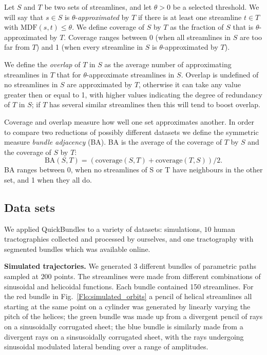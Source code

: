 \documentclass{bioinfo}
\begin{document}
\begin{methods}
Let $S$ and $T$ be two sets of streamlines, and let $\theta>0$ be a
selected threshold. We will say that $s \in S$ is
$\theta$-\emph{approximated} by $T$ if there is at least one streamline
$t \in T$ with $\mathrm{MDF}(s,t)\le \theta$. We define coverage of $S$
by $T$ as the fraction of $S$ that is $\theta$-approximated by $T$. Coverage
ranges between 0 (when all streamlines in $S$ are too far from $T$) and
1 (when every streamline in $S$ is $\theta$-approximated by $T$).

We define the \emph{overlap} of $T$ in $S$ as the average number of
approximating streamlines in $T$ that for $\theta$-approximate
streamlines in $S$.  Overlap is undefined of no streamlines in $S$ are
approximated by $T$, otherwise it can take any value greater then or
equal to 1, with higher values indicating the degree of redundancy of
$T$ in $S$; if $T$ has several similar streamlines then this will tend
to boost overlap.

Coverage and overlap measure how well one set approximates another. In
order to compare two reductions of possibly different datasets we
define the symmetric measure \emph{bundle adjacency} (BA).  BA is the
average of the coverage of $T$ by $S$ and the coverage of $S$ by
$T$: $$\mathrm{BA}(S,T) = (\mathrm{coverage}(S,T) +
\mathrm{coverage}(T,S))/2.$$ BA ranges between 0, when no streamlines of
S or T have neighbours in the other set, and 1 when they all do.

\subsection{\label{sub:QB-Data-sets}Data sets}

We applied QuickBundles to a variety of datasets: simulations, $10$
human tractographies collected and processed by ourselves, and one
tractography with segmented bundles which was available online.

\textbf{Simulated trajectories.} We generated $3$ different bundles of
parametric paths sampled at $200$ points. The streamlines were made from
different combinations of sinusoidal and helicoidal functions.  Each
bundle contained 150 streamlines.  For the red bundle in
Fig.~\ref{Flo:simulated_orbits} a pencil of helical streamlines all
starting at the same point on a cylinder was generated by linearly
varying the pitch of the helices; the green bundle was made up from a
divergent pencil of rays on a sinusoidally corrugated sheet; the blue
bundle is similarly made from a divergent rays on a sinsusoidally
corrugated sheet, with the rays undergoing sinusoidal modulated lateral
bending over a range of amplitudes.


\end{methods}
\end{document}
